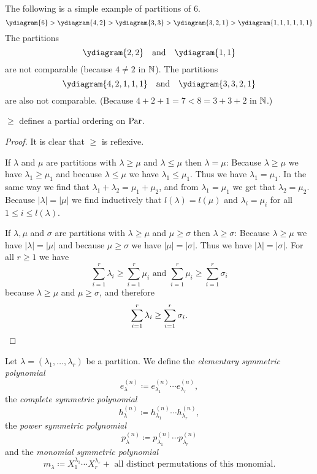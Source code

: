 \begin{expls}
 The following is a simple example of partitions of $6$.
 \[
  \ydiagram{6} > \ydiagram{4,2} > \ydiagram{3,3} > \ydiagram{3,2,1} > \ydiagram{1,1,1,1,1,1}
 \]
 The partitions
 \[
  \ydiagram{2,2} \quad \text{and} \quad \ydiagram{1,1}
 \]
 are not comparable (because $4 \neq 2$ in $\mathbb{N}$). The partitions
 \[
  \ydiagram{4,2,1,1,1} \quad \text{and} \quad \ydiagram{3,3,2,1}
 \]
 are also not comparable. (Because $4+2+1 = 7 < 8 = 3+3+2$ in $\mathbb{N}$.)
\end{expls}

\begin{lem}
 $\geq$ defines a partial ordering on $\operatorname{Par}$.
\end{lem}
\begin{proof}
 It is clear that $\geq$ is reflexive.
 
 If $\lambda$ and $\mu$ are partitions with $\lambda \geq \mu$ and $\lambda \leq \mu$ then $\lambda = \mu$: Because $\lambda \geq \mu$ we have $\lambda_1 \geq \mu_1$ and because $\lambda \leq \mu$ we have $\lambda_1 \leq \mu_1$. Thus we have $\lambda_1 = \mu_1$. In the same way we find that $\lambda_1 + \lambda_2 = \mu_1 + \mu_2$, and from $\lambda_1 = \mu_1$ we get that $\lambda_2 = \mu_2$. Because $|\lambda| = |\mu|$ we find inductively that $l(\lambda) = l(\mu)$ and $\lambda_i = \mu_i$ for all $1 \leq i \leq l(\lambda)$.
 
 If $\lambda, \mu$ and $\sigma$ are partitions with $\lambda \geq \mu$ and $\mu \geq \sigma$ then $\lambda \geq \sigma$: Because $\lambda \geq \mu$ we have $|\lambda| = |\mu|$ and because $\mu \geq \sigma$ we have $|\mu| = |\sigma|$. Thus we have $|\lambda| = |\sigma|$. For all $r \geq 1$ we have
 \[
  \sum_{i=1}^r \lambda_i \geq \sum_{i=1}^r \mu_i
  \text{ and }
  \sum_{i=1}^r \mu_i \geq \sum_{i=1}^r \sigma_i
 \]
 because $\lambda \geq \mu$ and $\mu \geq \sigma$, and therefore
 \[
  \sum_{i=1}^r \lambda_i \geq \sum_{i=1}^r \sigma_i.
  \qedhere
 \]
\end{proof}


\begin{defi}
 Let $\lambda = (\lambda_1, \dotsc, \lambda_r)$ be a partition. We define the \emph{elementary symmetric polynomial}
 \[
  e^{(n)}_\lambda \coloneqq e^{(n)}_{\lambda_1} \dotsm e^{(n)}_{\lambda_r},
 \]
 the \emph{complete symmetric polynomial}
 \[
  h^{(n)}_\lambda \coloneqq h^{(n)}_{\lambda_1} \dotsm h^{(n)}_{\lambda_r},
 \]
 the \emph{power symmetric polynomial}
 \[
  p^{(n)}_\lambda \coloneqq p^{(n)}_{\lambda_1} \dotsm p^{(n)}_{\lambda_r}
 \]
 and the \emph{monomial symmetric polynomial}
 \[
  m_\lambda \coloneqq X_1^{\lambda_1} \dotsm X_r^{\lambda_r} + \text{ all distinct permutations of this monomial}.
 \]
\end{defi}


